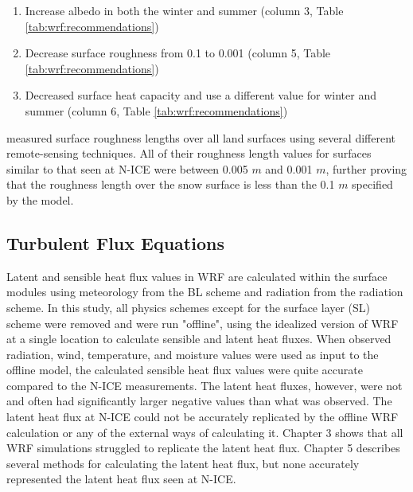\begin{enumerate}
  \item Increase albedo in both the winter and summer (column 3, Table \ref{tab:wrf:recommendations})
   \item Decrease surface roughness from 0.1 to 0.001 (column 5, Table \ref{tab:wrf:recommendations})
  \item Decreased surface heat capacity and use a different value for winter and summer (column 6, Table \ref{tab:wrf:recommendations})
\end{enumerate}

\citet{floors:2023} measured surface roughness lengths over all land surfaces using several different remote-sensing techniques. All of their roughness length values for surfaces similar to that seen at N-ICE were between 0.005 $m$ and 0.001 $m$, further proving that the roughness length over the snow surface is less than the 0.1 $m$ specified by the model.

\subsection{Turbulent Flux Equations}
Latent and sensible heat flux values in WRF are calculated within the surface modules using meteorology from the BL scheme and radiation from the radiation scheme. In this study, all physics schemes except for the surface layer (SL) scheme were removed and were run "offline", using the idealized version of WRF at a single location to calculate sensible and latent heat fluxes. When observed radiation, wind, temperature, and moisture values were used as input to the offline model, the calculated sensible heat flux values were quite accurate compared to the N-ICE measurements. The latent heat fluxes, however, were not and often had significantly larger negative values than what was observed. The latent heat flux at N-ICE could not be accurately replicated by the offline WRF calculation or any of the external ways of calculating it. Chapter 3 shows that all WRF simulations struggled to replicate the latent heat flux. Chapter 5 describes several methods for calculating the latent heat flux, but none accurately represented the latent heat flux seen at N-ICE.

